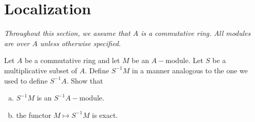 \newpage\section{Localization}
  \emph{Throughout this section, we assume that $A$ is a commutative ring. All modules are over $A$ unless otherwise specified.}

  \begin{ex}
    Let $A$ be a commutative ring and let $M$ be an $A-$module. Let $S$ be a multiplicative subset of $A$. Define $S^{-1}M$ in a manner analogous to the one we used to define $S^{-1}A$. Show that
    \begin{enumerate}[a)]
      \item $S^{-1}M$ is an $S^{-1}A-$module.
      \item the functor $M\mapsto S^{-1}M$ is exact.
    \end{enumerate}
  \end{ex}
